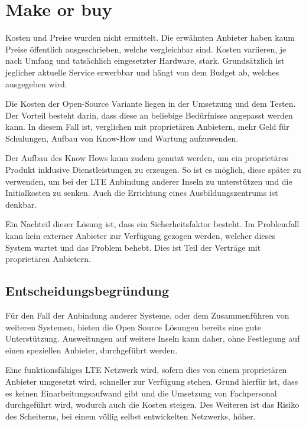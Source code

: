 
%
%
% 
% 
% 

\section{Make or buy}
\label{sec:make_buy}

Kosten und Preise wurden nicht ermittelt. Die erwähnten Anbieter haben kaum Preise öffentlich ausgeschrieben, welche vergleichbar sind. Kosten variieren, je nach Umfang und tatsächlich eingesetzter Hardware, stark. Grundsätzlich ist jeglicher aktuelle Service erwerbbar und hängt von dem Budget ab, welches ausgegeben wird.

Die Kosten der Open-Source Variante liegen in der Umsetzung und dem Testen. Der Vorteil besteht darin, dass diese an beliebige Bedürfnisse angepasst werden kann. In diesem Fall ist, verglichen mit proprietären Anbietern, mehr Geld für Schulungen, Aufbau von Know-How und Wartung aufzuwenden. 

Der Aufbau des Know Hows kann zudem genutzt werden, um ein proprietäres Produkt inklusive Dienstleistungen zu erzeugen. So ist es möglich, diese später zu verwenden, um bei der LTE Anbindung anderer Inseln zu unterstützen und die Initialkosten zu senken. Auch die Errichtung eines Ausbildungszentrums ist denkbar.

Ein Nachteil dieser Lösung ist, dass ein Sicherheitsfaktor besteht. Im Problemfall kann kein externer Anbieter zur Verfügung gezogen werden, welcher dieses System wartet und das Problem behebt. Dies ist Teil der Verträge mit proprietären Anbietern.

\subsection{Entscheidungsbegründung}
Für den Fall der Anbindung anderer Systeme, oder dem Zusammenführen von weiteren Systemen, bieten die Open Source Lösungen bereits eine gute Unterstützung. Ausweitungen auf weitere Inseln kann daher, ohne Festlegung auf einen speziellen Anbieter, durchgeführt werden.

Eine funktionsfähiges LTE Netzwerk wird, sofern dies von einem proprietären Anbieter umgesetzt wird, schneller zur Verfügung stehen. Grund hierfür ist, dass es keinen Einarbeitungsaufwand gibt und die Umsetzung von Fachpersonal durchgeführt wird, wodurch auch die Kosten steigen.
Des Weiteren ist das Risiko des Scheiterns, bei einem völlig selbst entwickelten Netzwerks, höher.


